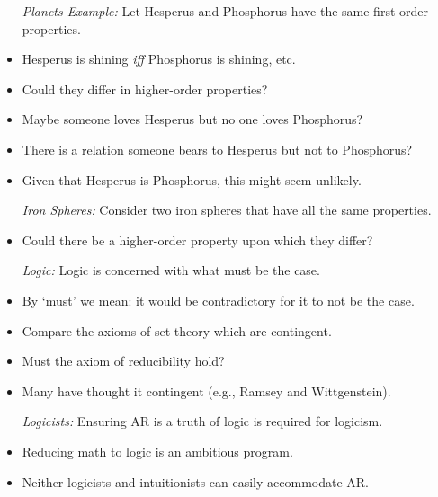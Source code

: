 \documentclass[a4paper, 11pt]{article} %
\begin{document}
\begin{itemize}
  \item[\it Planets Example:] Let Hesperus and Phosphorus have the same first-order properties.
    \item Hesperus is shining \textit{iff} Phosphorus is shining, etc.
    \item Could they differ in higher-order properties?
    \item Maybe someone loves Hesperus but no one loves Phosphorus?
    \item There is a relation someone bears to Hesperus but not to Phosphorus?
    \item Given that Hesperus is Phosphorus, this might seem unlikely.
  \item[\it Iron Spheres:] Consider two iron spheres that have all the same properties. 
    \item Could there be a higher-order property upon which they differ?
  \item[\it Logic:] Logic is concerned with what must be the case.
    \item By `must' we mean: it would be contradictory for it to not be the case.
    \item Compare the axioms of set theory which are contingent.
    \item Must the axiom of reducibility hold?
    \item Many have thought it contingent (e.g., Ramsey and Wittgenstein).
  \item[\it Logicists:] Ensuring AR is a truth of logic is required for logicism.
    \item Reducing math to logic is an ambitious program.
    \item Neither logicists and intuitionists can easily accommodate AR.
\end{itemize}
\end{document}
